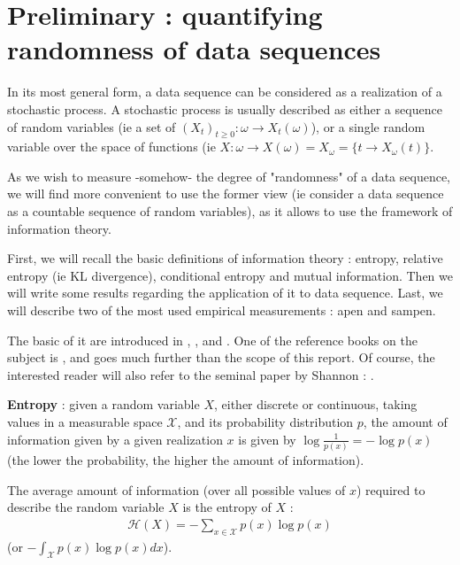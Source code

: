 \chapter{Preliminary : quantifying randomness of data sequences}\label{sec:Entropy and randomness}

In its most general form, a data sequence can be considered as a realization of a stochastic process. A stochastic process is usually described as either a sequence of random variables (ie a set of $(X_t)_{t \geq 0} : \omega \rightarrow X_t({\omega})$), or a single random variable over the space of functions (ie $X : \omega \rightarrow X(\omega) = X_{\omega} = \{ t \rightarrow X_{\omega}(t) \}$.

As we wish to measure -somehow- the degree of "randomness" of a data sequence, we will find more convenient to use the former view (ie consider a data sequence as a countable sequence of random variables), as it allows to use the framework of information theory.

First, we will recall the basic definitions of information theory : entropy, relative entropy (ie KL divergence), conditional entropy and mutual information. Then we will write some results regarding the application of \gls{it} to data sequence. Last, we will describe two of the most used empirical measurements : \gls{apen} and \gls{sampen}.

The basic of \gls{it} are introduced in \cite{bishop_pattern_2016}, \cite{ProbabilisticGraphicalModels}, and \cite{ProbabilisticMachineLearning}. One of the reference books on the subject is \cite{cover_elements_2006}, and goes much further than the scope of this report. Of course, the interested reader will also refer to the seminal paper by Shannon : \cite{shannon_mathematical_1948}.

\textbf{Entropy} : given a random variable $X$, either discrete or continuous, taking values in a measurable space $\mathcal{X}$, and its probability distribution $p$, the amount of information given by a given realization $x$ is given by $\log{\frac{1}{p(x)}} = - \log{p(x)}$ (the lower the probability, the higher the amount of information). 

The average amount of information (over all possible values of $x$) required to describe the random variable $X$ is the entropy of $X$ : 
\begin{align}
    \mathcal{H}(X) = - \sum_{x \in \mathcal{X}} p(x)\log{p(x)}
\end{align}
(or $-\int_{\mathcal{X}} p(x)\log{p(x)}dx$).

